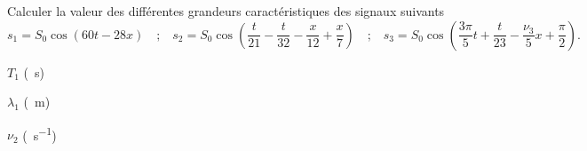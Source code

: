Calculer la valeur des différentes grandeurs caractéristiques des signaux suivants
$$s_1 = S_0 \cos \left( 60 t - 28 x\right)
\quad \text{;} \quad
s_2 = S_0 \cos \left( \frac{t}{21} -\frac{t}{32} - \frac{x}{12} +\frac{x}{7}\right)
\quad \text{;} \quad
s_3 = S_0 \cos \left( \frac{3\pi}{5}t + \frac{t}{23} - \frac{\nu_3}{5} x + \frac{\pi}{2} \right).
$$
\debutEntrainement


\begin{enonce}
	$T_1$  (\SI{}{s})
	\end{enonce}
		
		
		


\begin{enonce}
$\lambda_1$  (\SI{}{m})
\end{enonce}






\begin{enonce}
	$\nu_2$ (\SI{}{s^{-1}})
	\end{enonce}
		
		
		


